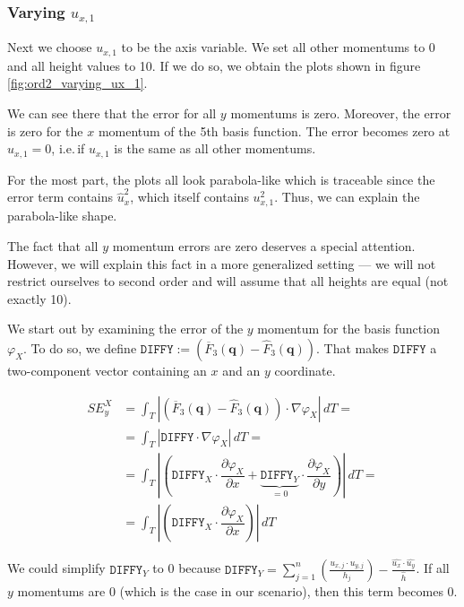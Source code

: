 \documentclass[a4paper, twoside]{article}
\newcommand{\pd}[2]{\dfrac{\partial #1}{\partial #2}}
\renewcommand{\phi}{\varphi}
\begin{document}
\subsubsection{\texorpdfstring{Varying $u_{x,1}$}{Varying ux1}}
\label{sec:stiffness-analysis-ord2-default-var-ux1}

Next we choose $u_{x,1}$ to be the axis variable. We set all other momentums to 0 and all height values to 10. If we do so, we obtain the plots shown in figure \ref{fig:ord2_varying_ux_1}.



We can see there that the error for all $y$ momentums is zero. Moreover, the error is zero for the $x$ momentum of the 5th basis function. The error becomes zero at $u_{x,1}=0$, i.e.\,if $u_{x,1}$ is the same as all other momentums.

For the most part, the plots all look parabola-like which is traceable since the error term contains $\widehat{u}_x^2$, which itself contains $u_{x,1}^2$. Thus, we can explain the parabola-like shape.

The fact that all $y$ momentum errors are zero deserves a special attention. However, we will explain this fact in a more generalized setting --- we will not restrict ourselves to second order and will assume that all heights are equal (not exactly 10).

We start out by examining the error of the $y$ momentum for the basis function $\phi_X$. To do so, we define $\mathtt{DIFFY}:=\left( \overline{F}_3(\mathbf{q}) - \widehat{F}_3(\mathbf{q}) \right)$. That makes $\mathtt{DIFFY}$ a two-component vector containing an $x$ and an $y$ coordinate.

\begin{align*}
  SE_y^X &= \int_T \left| \left( \overline{F}_3(\mathbf{q}) - \widehat{F}_3(\mathbf{q}) \right) \cdot \nabla \phi_X \right| \, dT = \\
  &= \int_T \left| \mathtt{DIFFY} \cdot \nabla \phi_X \right|\,dT = \\
  &= \int_T \left| \left( \mathtt{DIFFY}_X \cdot \pd{\phi_X}{x} + \underbrace{\mathtt{DIFFY}_Y}_{=0} \cdot \pd{\phi_X}{y} \right) \right| \, dT = \\
  &=\int_T \left| \left( \mathtt{DIFFY}_X \cdot \pd{\phi_X}{x} \right) \right| \, dT
\end{align*}

We could simplify $\mathtt{DIFFY}_Y$ to 0 because $\mathtt{DIFFY}_Y=\sum_{j=1}^n\left( \frac{u_{x,j}\cdot u_{y,j}}{h_j} \right)-\frac{\widehat{u_x}\cdot\widehat{u_y}}{\widehat{h}}$. If all $y$ momentums are 0 (which is the case in our scenario), then this term becomes 0.
\end{document}
